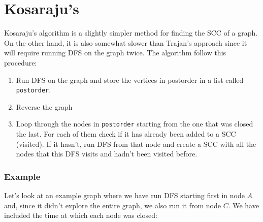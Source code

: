 \newpage
\section{Kosaraju's}
Kosaraju's algorithm is a slightly simpler method for finding the SCC of a graph. 
On the other hand, it is also somewhat slower than Trajan's approach since it will
require running DFS on the graph twice. The algorithm follow this procedure:
\begin{enumerate}
	\item Run DFS on the graph and store the vertices in postorder in a list 
		called \texttt{postorder}.
	\item Reverse the graph
	\item Loop through the nodes in \texttt{postorder} starting from the one that 
		was closed the last. For each of them check if it has already been 
		added to a SCC (visited). If it hasn't, run DFS from that node and
		create a SCC with all the nodes that this DFS visits and hadn't been
		visited before.
\end{enumerate}
\subsubsection{Example}
Let's look at an example graph where we have run DFS starting first in node 
$A$ and, since it didn't explore the entire graph, we also run it from node $C$.
We have included the time at which each node was closed:
\begin{figure}[h]
\centering
{}
\end{figure}

